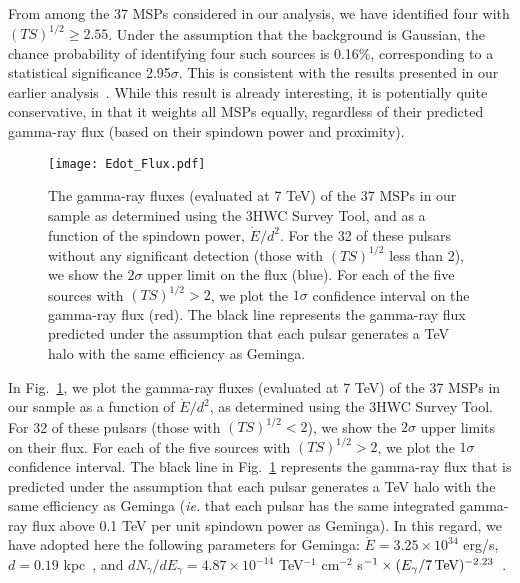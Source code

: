 \documentclass[aps,prd,twocolumn,amsmath,superscriptaddress,amssymb,showpacs,floatfix,nofootinbib,longbibliography,preprintnumbers]{revtex4-1}
\begin{document}
From among the 37 MSPs considered in our analysis, we have identified four with $(TS)^{1/2} \ge 2.55$. Under the assumption that the background is Gaussian, the chance probability of identifying four such sources is 0.16\%, corresponding to a statistical significance 2.95$\sigma$. This is consistent with the results presented in our earlier analysis~\cite{Hooper:2018fih}. While this result is already interesting, it is potentially quite conservative, in that it weights all MSPs equally, regardless of their predicted gamma-ray flux (based on their spindown power and proximity). 





\begin{figure}
\texttt{[image: Edot\_Flux.pdf]}
\caption{The gamma-ray fluxes (evaluated at 7 TeV) of the 37 MSPs in our sample as determined using the 3HWC Survey Tool, and as a function of the spindown power, $\dot{E}/d^2$. For the 32 of these pulsars without any significant detection (those with $(TS)^{1/2}$ less than 2), we show the $2\sigma$ upper limit on the flux (blue). For each of the five sources with $(TS)^{1/2} > 2$, we plot the $1\sigma$ confidence interval on the gamma-ray flux (red). The black line represents the gamma-ray flux predicted under the assumption that each pulsar generates a TeV halo with the same efficiency as Geminga.}
\label{Edotflux}
\end{figure}



In Fig.~\ref{Edotflux}, we plot the gamma-ray fluxes (evaluated at 7 TeV) of the 37 MSPs in our sample as a function of $\dot{E}/d^2$, as determined using the 3HWC Survey Tool. For 32 of these pulsars (those with $(TS)^{1/2} < 2$), we show the $2\sigma$ upper limits on their flux. For each of the five sources with $(TS)^{1/2} > 2$, we plot the $1\sigma$ confidence interval. The black line in Fig.~\ref{Edotflux} represents the gamma-ray flux that is predicted under the assumption that each pulsar generates a TeV halo with the same efficiency as Geminga (\textit{ie.} that each pulsar has the same integrated gamma-ray flux above 0.1 TeV per unit spindown power as Geminga). In this regard, we have adopted here the following parameters for Geminga: $\dot{E}=3.25 \times 10^{34}$ erg/s, $d=0.19$ kpc~\cite{Manchester:2004bp}, and $dN_{\gamma}/dE_{\gamma} = 4.87 \times 10^{-14}$ TeV$^{-1}$ cm$^{-2}$ s$^{-1} \times (E_{\gamma}/7 \, {\rm TeV})^{-2.23}$~\cite{Abeysekara:2017hyn}. 
\end{document}

